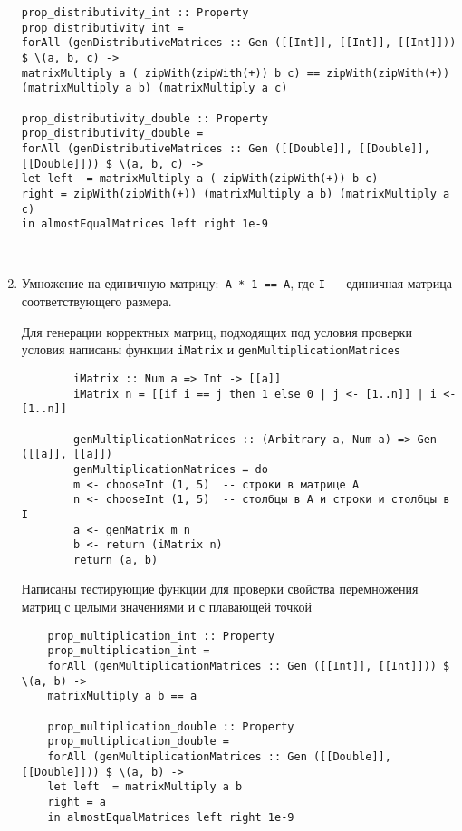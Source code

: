 \documentclass[10pt,a4paper,final]{article} %
\begin{document}
\begin{enumerate}
	\begin{lstlisting}
prop_distributivity_int :: Property
prop_distributivity_int =
forAll (genDistributiveMatrices :: Gen ([[Int]], [[Int]], [[Int]])) $ \(a, b, c) ->
matrixMultiply a ( zipWith(zipWith(+)) b c) == zipWith(zipWith(+)) (matrixMultiply a b) (matrixMultiply a c)

prop_distributivity_double :: Property
prop_distributivity_double =
forAll (genDistributiveMatrices :: Gen ([[Double]], [[Double]], [[Double]])) $ \(a, b, c) ->
let left  = matrixMultiply a ( zipWith(zipWith(+)) b c)
right = zipWith(zipWith(+)) (matrixMultiply a b) (matrixMultiply a c)
in almostEqualMatrices left right 1e-9

	\end{lstlisting}
	
	﻿﻿﻿
	﻿﻿﻿\item Умножение на единичную матрицу:\texttt{ А * 1 == А}, где \texttt{I} — единичная матрица соответствующего размера.
	
	
	Для генерации корректных матриц, подходящих под условия проверки условия написаны функции \texttt{iMatrix}  и \texttt{genMultiplicationMatrices}
	\begin{lstlisting}
		iMatrix :: Num a => Int -> [[a]]
		iMatrix n = [[if i == j then 1 else 0 | j <- [1..n]] | i <- [1..n]]
				
		genMultiplicationMatrices :: (Arbitrary a, Num a) => Gen ([[a]], [[a]])
		genMultiplicationMatrices = do
		m <- chooseInt (1, 5)  -- строки в матрице A
		n <- chooseInt (1, 5)  -- столбцы в A и строки и столбцы в I 
		a <- genMatrix m n
		b <- return (iMatrix n)
		return (a, b)

	\end{lstlisting}
	Написаны тестирующие функции для проверки свойства перемножения матриц с целыми значениями  и с плавающей точкой
	
	\begin{lstlisting}
	prop_multiplication_int :: Property
	prop_multiplication_int =
	forAll (genMultiplicationMatrices :: Gen ([[Int]], [[Int]])) $ \(a, b) ->
	matrixMultiply a b == a
	
	prop_multiplication_double :: Property
	prop_multiplication_double =
	forAll (genMultiplicationMatrices :: Gen ([[Double]], [[Double]])) $ \(a, b) ->
	let left  = matrixMultiply a b
	right = a
	in almostEqualMatrices left right 1e-9
	\end{lstlisting}
	
	
\end{enumerate}
\end{document}
